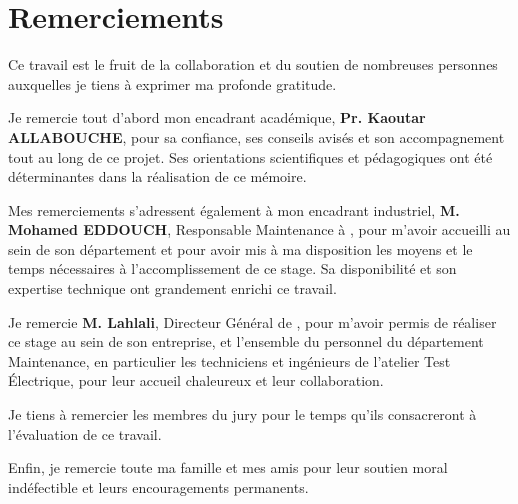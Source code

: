 \chapter*{Remerciements}

Ce travail est le fruit de la collaboration et du soutien de nombreuses personnes auxquelles je tiens \`a exprimer ma profonde gratitude.

Je remercie tout d'abord mon encadrant acad\'emique, \textbf{Pr. Kaoutar ALLABOUCHE}, pour sa confiance, ses conseils avis\'es et son accompagnement tout au long de ce projet. Ses orientations scientifiques et p\'edagogiques ont \'et\'e d\'eterminantes dans la r\'ealisation de ce m\'emoire.

Mes remerciements s'adressent \'egalement \`a mon encadrant industriel, \textbf{M. Mohamed EDDOUCH}, Responsable Maintenance \`a \sews, pour m'avoir accueilli au sein de son d\'epartement et pour avoir mis \`a ma disposition les moyens et le temps n\'ecessaires \`a l'accomplissement de ce stage. Sa disponibilit\'e et son expertise technique ont grandement enrichi ce travail.

Je remercie \textbf{M. Lahlali}, Directeur G\'en\'eral de \sews, pour m'avoir permis de r\'ealiser ce stage au sein de son entreprise, et l'ensemble du personnel du d\'epartement Maintenance, en particulier les techniciens et ing\'enieurs de l'atelier Test \'Electrique, pour leur accueil chaleureux et leur collaboration.

Je tiens \`a remercier les membres du jury pour le temps qu'ils consacreront \`a l'\'evaluation de ce travail.

Enfin, je remercie toute ma famille et mes amis pour leur soutien moral ind\'efectible et leurs encouragements permanents.

